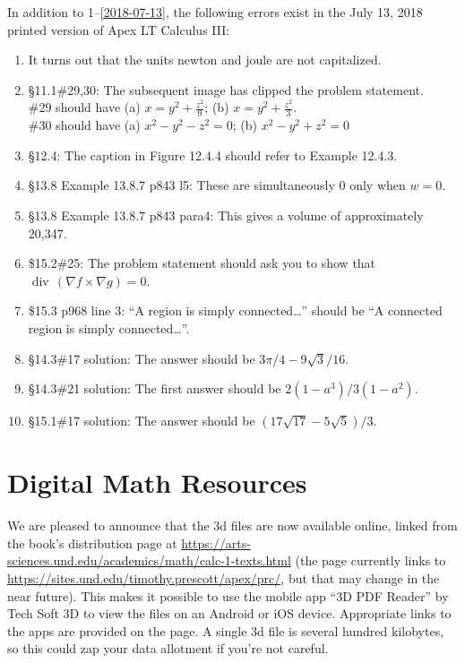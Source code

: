 \documentclass{amsart}
\newcommand{\ds}{\displaystyle}
\DeclareMathOperator{\divv}{div}
\begin{document}
In addition to 1--\ref{2018-07-13}, the following errors exist in the July 13, 2018 printed version of Apex LT Calculus III:
\begin{enumerate}
\item It turns out that the units newton and joule are not capitalized.
\item \S11.1\#29,30: The subsequent image has clipped the problem statement.\\
 \#29 should have (a) $\ds x=y^2+\frac{z^2}{9}$; (b) $\ds x=y^2+\frac{z^2}{3}$.\\
 \#30 should have (a) $\ds x^2-y^2-z^2=0$; (b) $x^2-y^2+z^2=0$
\item \S12.4: The caption in Figure 12.4.4 should refer to Example 12.4.3.
\item \S13.8 Example 13.8.7 p843 l5: These are simultaneously 0 only when $w=0$.
\item \S13.8 Example 13.8.7 p843 para4: This gives a volume of approximately 20{,}347.
\item \$15.2\#25: The problem statement should ask you to show that $\divv\,(\nabla f\times\nabla g) = 0$.
\item \$15.3 p968 line 3: ``A region is simply connected\ldots'' should be ``A connected region is simply connected\ldots''.
\item \S14.3\#17 solution: The answer should be $3\pi/4-9\sqrt3/16$.
\item \S14.3\#21 solution: The first answer should be $2(1-a^3)/3(1-a^2)$.
\item \S15.1\#17 solution: The answer should be $(17\sqrt{17} - 5\sqrt{5})/3$.
\label{2018-07-13IIIplus}
\end{enumerate}

\section*{Digital Math Resources}

We are pleased to announce that the 3d files are now available online, linked from the book's distribution page at \url{https://arts-sciences.und.edu/academics/math/calc-1-texts.html} (the page currently links to \url{https://sites.und.edu/timothy.prescott/apex/prc/}, but that may change in the near future).  This makes it possible to use the mobile app ``3D PDF Reader'' by Tech Soft 3D to view the files on an Android or iOS device.  Appropriate links to the apps are provided on the page.  A single 3d file is several hundred kilobytes, so this could zap your data allotment if you're not careful.
\end{document}

